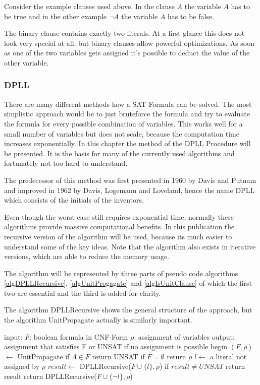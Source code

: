 Consider the example clauses used above. In the clause $A$ the variable $A$ has to be true and in the other example $\lnot A$ the variable $A$ has to be false.

The binary clause contains exactly two literals. At a first glance this does not look very special at all, but binary clauses allow powerful optimizations. As soon as one of the two variables gets assigned it's possible to deduct the value of the other variable.
\subsubsection{DPLL}

There are many different methods how a SAT Formula can be solved. The most simplistic approach would be to just bruteforce the formula and try to evaluate the formula for every possible combination of variables. This works well for a small number of variables but does not scale, because the computation time increases exponentially. In this chapter the method of the DPLL Procedure will be presented. It is the basis for many of the currently used algorithms and fortunately not too hard to understand.

The predecessor of this method was first presented in 1960 by Davis and Putnam and improved in 1962 by Davis, Logemann and Loveland, hence the name DPLL which consists of the initials of the inventors.

Even though the worst case still requires exponential time, normally these algorithms provide massive computational benefits. In this publication the recursive version of the algorithm will be used, because its much easier to understand some of the key ideas. Note that the algorithm also exists in iterative versions, which are able to reduce the memory usage.

The algorithm will be represented by three parts of pseudo code algorithms \ref{algDPLLRecursive}, \ref{algUnitProgagate} and \ref{algIsUnitClause} of which the first two are essential and the third is added for clarity.

The algorithm DPLLRecursive shows the general structure of the approach, but the algorithm UnitPropagate actually is similarly important.

\begin{algorithm}[caption={DPLLRecursive}, label={algDPLLRecursive}]
 input: $F$: boolean formula in CNF-Form
	$\rho$: assignment of variables
 output: assignment that satisfies F or 
	UNSAT if no assignment is possible
 begin
   $(F, \rho)$  $\gets$ UnitPropagate
   if $\Lambda \in F$
	return UNSAT
   if $F = \emptyset$
	return $\rho$
   $l \gets$ a literal not assigned by $\rho$
   $result \gets$ DPLLRecursive($F \cup \{l\}, \rho$)
   if $result \neq UNSAT$
	return result
   return DPLLRecursive($F \cup \{\lnot l\}, \rho$)
\end{algorithm}

